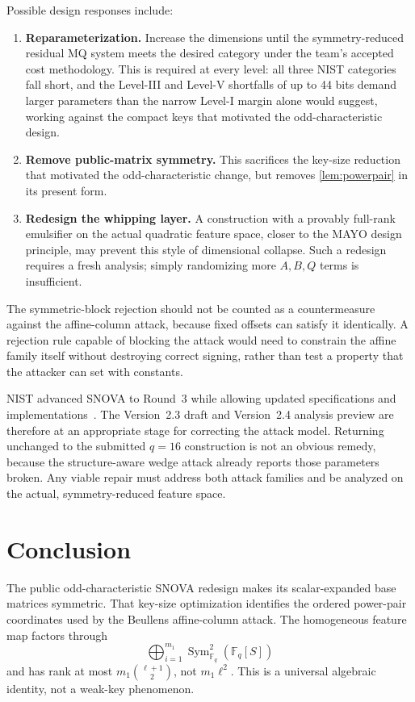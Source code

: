 \documentclass[runningheads]{llncs}
\newcommand{\F}{\mathbb F}
\newcommand{\Sym}{\operatorname{Sym}}
\newcommand{\SNOVA}{\textsf{SNOVA}}
\begin{document}
Possible design responses include:
\begin{enumerate}
\item \textbf{Reparameterization.} Increase the dimensions until the symmetry-reduced residual MQ system meets the desired category under the team's accepted cost methodology.  This is required at every level: all three NIST categories fall short, and the Level-III and Level-V shortfalls of up to 44 bits demand larger parameters than the narrow Level-I margin alone would suggest, working against the compact keys that motivated the odd-characteristic design.
\item \textbf{Remove public-matrix symmetry.} This sacrifices the key-size reduction that motivated the odd-characteristic change, but removes \cref{lem:powerpair} in its present form.
\item \textbf{Redesign the whipping layer.} A construction with a provably full-rank emulsifier on the actual quadratic feature space, closer to the MAYO design principle, may prevent this style of dimensional collapse.  Such a redesign requires a fresh analysis; simply randomizing more $A,B,Q$ terms is insufficient.
\end{enumerate}

The symmetric-block rejection should not be counted as a countermeasure against the affine-column attack, because fixed offsets can satisfy it identically.  A rejection rule capable of blocking the attack would need to constrain the affine family itself without destroying correct signing, rather than test a property that the attacker can set with constants.

NIST advanced \SNOVA{} to Round~3 while allowing updated specifications and implementations~\cite{NISTRound3}.  The Version~2.3 draft and Version~2.4 analysis preview are therefore at an appropriate stage for correcting the attack model.  Returning unchanged to the submitted $q=16$ construction is not an obvious remedy, because the structure-aware wedge attack already reports those parameters broken.  Any viable repair must address both attack families and be analyzed on the actual, symmetry-reduced feature space.

\section{Conclusion}\label{sec:conclusion}

The public odd-characteristic \SNOVA{} redesign makes its scalar-expanded base matrices symmetric.  That key-size optimization identifies the ordered power-pair coordinates used by the Beullens affine-column attack.  The homogeneous feature map factors through
\[
 \bigoplus_{i=1}^{m_1}\Sym^2_{\F_q}(\F_q[S])
\]
and has rank at most $m_1\binom{\ell+1}{2}$, not $m_1\ell^2$.  This is a universal algebraic identity, not a weak-key phenomenon.
\end{document}
